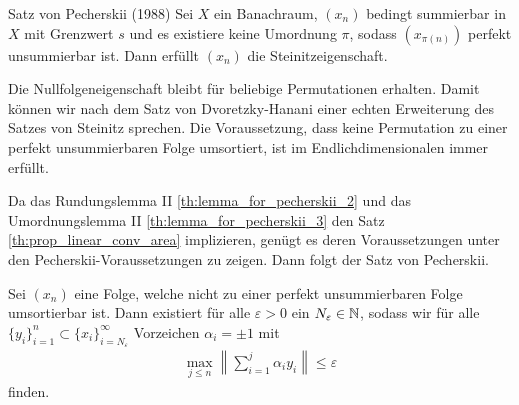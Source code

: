 \begin{genericthm}{Satz von Pecherskii (1988)}\label{th:lemma_of_pecherskii}
	Sei $ X $ ein Banachraum, $ (x_n) $ bedingt summierbar in $ X $ mit Grenzwert $ s $ und es existiere keine Umordnung $ \pi  $, sodass $ (x_{\pi(n)}) $ perfekt unsummierbar ist.
	Dann erfüllt $ (x_n) $ die Steinitzeigenschaft.
\end{genericthm}
Die Nullfolgeneigenschaft bleibt für beliebige Permutationen erhalten.
Damit können wir nach dem Satz von Dvoretzky-Hanani einer echten Erweiterung des Satzes von Steinitz sprechen. 
Die Voraussetzung, dass keine Permutation zu einer perfekt unsummierbaren Folge umsortiert, ist im Endlichdimensionalen immer erfüllt. 

Da das Rundungslemma II \ref{th:lemma_for_pecherskii_2} und das Umordnungslemma II \ref{th:lemma_for_pecherskii_3} den Satz \ref{th:prop_linear_conv_area} implizieren, genügt es deren Voraussetzungen unter den Pecherskii-Voraussetzungen zu zeigen.
Dann folgt der Satz von Pecherskii.


\begin{lem}\label{th:lemma_for_pecherskii_1}
	Sei $ (x_n) $ eine Folge, welche nicht zu einer perfekt unsummierbaren Folge umsortierbar ist.
	Dann existiert für alle $ \varepsilon >0 $ ein $ N_\varepsilon \in \mathbb{N} $,
	sodass wir für alle $ \{y_i\}_{i = 1}^n \subset \{x_i\}_{i = N_\varepsilon}^\infty $ Vorzeichen $ \alpha_i = \pm 1 $ mit
	\begin{align}\label{eq:prop_for_steiniz}
		\max \limits_{j \leq n}
		\left\|
		\sum \limits_{i = 1}^j \alpha_i y_i
		\right\|
		\leq \varepsilon
	\end{align}
	finden.
\end{lem}

